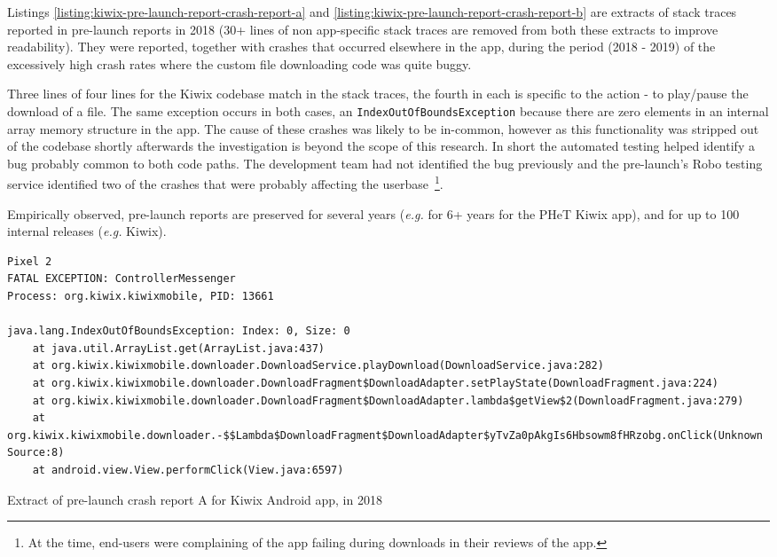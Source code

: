 Listings \ref{listing:kiwix-pre-launch-report-crash-report-a} and \ref{listing:kiwix-pre-launch-report-crash-report-b} are extracts of stack traces reported in pre-launch reports in 2018 (30+ lines of non app-specific stack traces are removed from both these extracts to improve readability). They were reported, together with crashes that occurred elsewhere in the app, during the period (2018 - 2019) of the excessively high crash rates where the custom file downloading code was quite buggy. %

Three lines of four lines for the Kiwix codebase match in the stack traces, the fourth in each is specific to the action - to play/pause the download of a file. The same exception occurs in both cases, an \texttt{IndexOutOfBoundsException} because there are zero elements in an internal array memory structure in the app. The cause of these crashes was likely to be in-common, however as this functionality was stripped out of the codebase shortly afterwards the investigation is beyond the scope of this research. In short the automated testing helped identify a bug probably common to both code paths. The development team had not identified the bug previously and the pre-launch's Robo testing service identified two of the crashes that were probably affecting the userbase~\footnote{At the time, end-users were complaining of the app failing during downloads in their reviews of the app.}. 

Empirically observed, pre-launch reports are preserved for several years (\emph{e.g.} for 6+ years for the PHeT Kiwix app), and for up to 100 internal releases (\emph{e.g.} Kiwix).

\begin{listing}
\begin{verbatim}
Pixel 2
FATAL EXCEPTION: ControllerMessenger
Process: org.kiwix.kiwixmobile, PID: 13661

java.lang.IndexOutOfBoundsException: Index: 0, Size: 0
	at java.util.ArrayList.get(ArrayList.java:437)
	at org.kiwix.kiwixmobile.downloader.DownloadService.playDownload(DownloadService.java:282)
	at org.kiwix.kiwixmobile.downloader.DownloadFragment$DownloadAdapter.setPlayState(DownloadFragment.java:224)
	at org.kiwix.kiwixmobile.downloader.DownloadFragment$DownloadAdapter.lambda$getView$2(DownloadFragment.java:279)
	at org.kiwix.kiwixmobile.downloader.-$$Lambda$DownloadFragment$DownloadAdapter$yTvZa0pAkgIs6Hbsowm8fHRzobg.onClick(Unknown Source:8)
	at android.view.View.performClick(View.java:6597)

\end{verbatim}
\caption{Extract of pre-launch crash report A for Kiwix Android app, in 2018}
\label{listing:kiwix-pre-launch-report-crash-report-a}
\end{listing}


